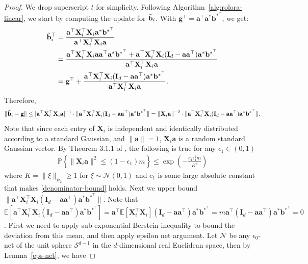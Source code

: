 \documentclass{article}
\theoremstyle{plain}
\theoremstyle{definition}
\theoremstyle{remark}
\begin{document}
\begin{proof}
    
 We drop superscript $t$ for simplicity. Following Algorithm~\ref{alg:rolora-linear}, we start by computing the update for $\Tilde{\mathbf{b}}_i$.  With $\mathbf{g}^\top = \mathbf{a}^\top \mathbf{a}^* \mathbf{b}^{*^\top}$, we get:
\begin{align}
    \Tilde{\mathbf{b}}_i^\top &= \frac{\mathbf{a}^\top \mathbf{X}_i^\top \mathbf{X}_i \mathbf{a}^* \mathbf{b}^{*^\top} }{\mathbf{a}^\top \mathbf{X}_i^\top\mathbf{X}_i \mathbf{a}} \\
    & = \frac{\mathbf{a}^\top \mathbf{X}_i^\top \mathbf{X}_i \mathbf{a}\mathbf{a}^\top \mathbf{a}^* \mathbf{b}^{*^\top} + \mathbf{a}^\top \mathbf{X}_i^\top \mathbf{X}_i (\mathbf{I}_d - \mathbf{a}\mathbf{a}^\top) \mathbf{a}^* \mathbf{b}^{*^\top}}{\mathbf{a}^\top \mathbf{X}_i^\top\mathbf{X}_i \mathbf{a}} \\
    & = \mathbf{g}^\top + \frac{ \mathbf{a}^\top \mathbf{X}_i^\top \mathbf{X}_i (\mathbf{I}_d - \mathbf{a}\mathbf{a}^\top) \mathbf{a}^* \mathbf{b}^{*^\top}}{\mathbf{a}^\top \mathbf{X}_i^\top\mathbf{X}_i \mathbf{a}}.
\end{align}
Therefore, 
\begin{equation}\label{difference_bi_g}
    \|\Tilde{\mathbf{b}}_i - \mathbf{g}\|  \leq |\mathbf{a}^\top \mathbf{X}_i^\top\mathbf{X}_i \mathbf{a}|^{-1}\cdot \lVert \mathbf{a}^\top \mathbf{X}_i^\top \mathbf{X}_i (\mathbf{I}_d - \mathbf{a}\mathbf{a}^\top)\mathbf{a}^*\mathbf{b}^{*^\top}\rVert = \|\mathbf{X}_i \mathbf{a}\|^{-2}\cdot \lVert \mathbf{a}^\top \mathbf{X}_i^\top \mathbf{X}_i (\mathbf{I}_d - \mathbf{a}\mathbf{a}^\top)\mathbf{a}^*\mathbf{b}^{*^\top}\rVert.
\end{equation}
Note that since each entry of $\mathbf{X}_i$ is independent and identically distributed according to a standard Gaussian, and $\lVert \mathbf{a}\rVert = 1$, $\mathbf{X}_i \mathbf{a} $ is a random standard Gaussian vector. By Theorem 3.1.1 of \cite{vershynin2018high}, the following is true for any $\epsilon_1 \in (0,1)$
\begin{align}
    \mathbb{P} \left\{ \lVert \mathbf{X}_i \mathbf{a}\rVert^2 \leq (1-\epsilon_1)m\right\} \leq \exp{(- \frac{c_1  \epsilon_1^2 m}{K^4})} \label{denominator-bound}
\end{align}
where $K = \|\xi\|_{\psi_2} \ge 1$ for $\xi \sim \mathcal N(0,1)$ and $c_1$ is some large absolute constant that makes \eqref{denominator-bound} holds. Next we upper bound $\rVert \mathbf{a}^\top \mathbf{X}_i^\top \mathbf{X}_i (\mathbf{I}_d - \mathbf{a}\mathbf{a}^\top)\mathbf{a}^*\mathbf{b}^{*^\top}\lVert$. Note that $\mathbb{E}[\mathbf{a}^\top \mathbf{X}_i^\top \mathbf{X}_i (\mathbf{I}_d - \mathbf{a}\mathbf{a}^\top)\mathbf{a}^*\mathbf{b}^{*^\top}] = \mathbf{a}^\top \mathbb{E}[\mathbf{X}_i^\top \mathbf{X}_i] (\mathbf{I}_d - \mathbf{a}\mathbf{a}^\top)\mathbf{a}^*\mathbf{b}^{*^\top}=m\mathbf{a}^\top(\mathbf{I}_d - \mathbf{a}\mathbf{a}^\top)\mathbf{a}^*\mathbf{b}^{*^\top}=0$. First we need to apply sub-exponential Berstein inequality to bound the deviation from this mean, and then apply epsilon net argument. Let $\mathcal N$ be any $\epsilon_0$-net of the unit sphere $\mathcal S^{d-1}$ in the $d$-dimensional real Euclidean space, then by Lemma~\ref{eps-net}, we have

\end{proof}
\end{document}
